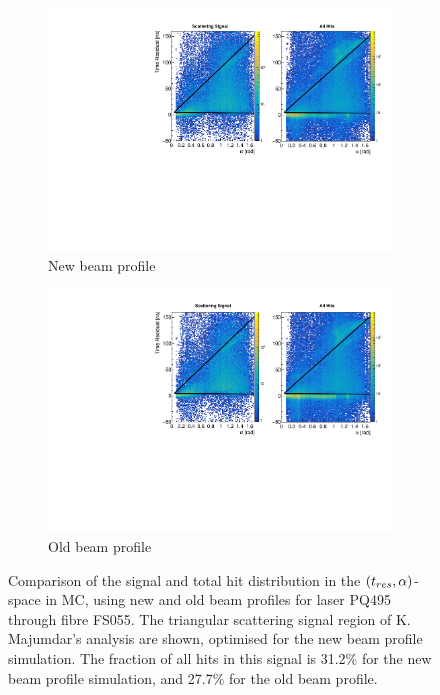 \begin{figure}
    \centering
    \begin{subfigure}{0.98\textwidth}
        \centering
        \includegraphics[width=\textwidth]{5_SMELLIEAnalysis/images/FS055_PQ495_new_beam_profile_signal_vs_all_tres_alpha_plot.pdf}
        \caption{New beam profile}
        \label{fig:smellie_tresalpha_mc}
    \end{subfigure}
    \begin{subfigure}{0.98\textwidth}
        \centering
        \includegraphics[width=\textwidth]{5_SMELLIEAnalysis/images/FS055_PQ495_old_beam_profile_signal_vs_all_tres_alpha_plot.pdf}
        \caption{Old beam profile}
        \label{fig:smellie_tresalpha_mc2}
    \end{subfigure}
    \caption[Comparison of the signal and total hit distribution in the $(\tres{},\alpha)$-space using new and old beam profiles for laser PQ495 through fibre FS055]
    {Comparison of the signal and total hit distribution in the $(\tres{},\alpha)$-space in MC, using new and old beam profiles for laser PQ495 through fibre FS055. The triangular scattering signal region of K. Majumdar's analysis are shown, optimised for the new beam profile simulation. The fraction of all hits in this signal is 31.2\% for the new beam profile simulation, and 27.7\% for the old beam profile.}
    \label{fig:smellie_tres_alpha_data_mc}
\end{figure}

